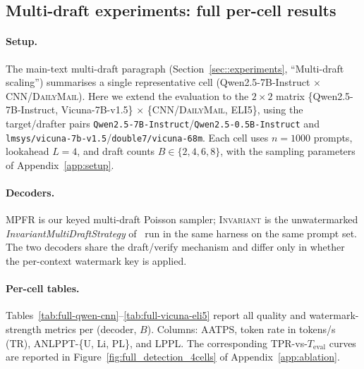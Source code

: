 \subsection{Multi-draft experiments: full per-cell results}
\label{app:multi_draft_full}

\paragraph{Setup.}
The main-text multi-draft paragraph (Section~\ref{sec::experiments},
``Multi-draft scaling'') summarises a single representative cell
(Qwen2.5-7B-Instruct $\times$ \textsc{CNN/DailyMail}). Here we extend the
evaluation to the $2{\times}2$ matrix
\{Qwen2.5-7B-Instruct, Vicuna-7B-v1.5\} $\times$
\{\textsc{CNN/DailyMail}, \textsc{ELI5}\}, using the target/drafter pairs
\texttt{Qwen2.5-7B-Instruct}/\texttt{Qwen2.5-0.5B-Instruct} and
\texttt{lmsys/vicuna-7b-v1.5}/\texttt{double7/vicuna-68m}.
Each cell uses $n{=}1000$ prompts, lookahead $L{=}4$, and draft counts
$B\in\{2,4,6,8\}$, with the sampling parameters of Appendix~\ref{app:setup}.

\paragraph{Decoders.}
\textsc{MPFR} is our keyed multi-draft Poisson sampler;
\textsc{Invariant} is the unwatermarked
\emph{InvariantMultiDraftStrategy} of~\citet{rowan2025list} run in the same
harness on the same prompt set. The two decoders share the draft/verify
mechanism and differ only in whether the per-context watermark key is applied.

\paragraph{Per-cell tables.}
Tables~\ref{tab:full-qwen-cnn}--\ref{tab:full-vicuna-eli5} report all quality
and watermark-strength metrics per (decoder, $B$). Columns: AATPS, token rate
in tokens/s (TR), ANLPPT-\{U, Li, PL\}, and LPPL. The corresponding
TPR-vs-$T_{\mathrm{eval}}$ curves are reported in
Figure~\ref{fig:full_detection_4cells} of Appendix~\ref{app:ablation}.

